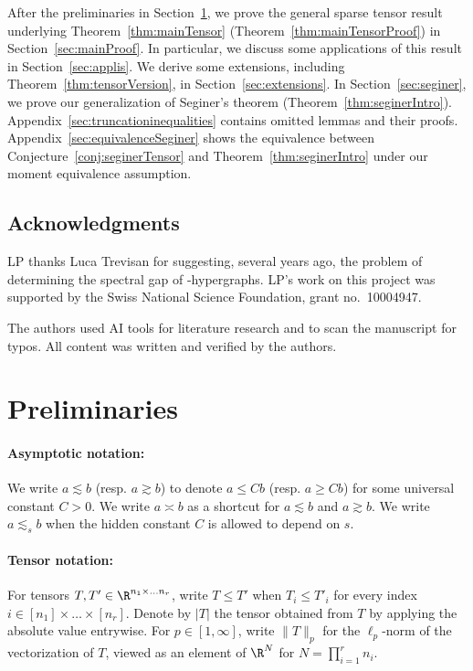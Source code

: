\documentclass[11pt,a4paper]{article}
\begin{document}
After the preliminaries in Section~\ref{sec:prelims}, we prove
the general sparse tensor result underlying Theorem~\ref{thm:mainTensor} (Theorem~\ref{thm:mainTensorProof}) in
Section~\ref{sec:mainProof}. In particular,
we discuss some applications of
this result in Section~\ref{sec:applis}.
We derive some extensions, including Theorem~\ref{thm:tensorVersion},
in Section~\ref{sec:extensions}.
In Section~\ref{sec:seginer}, we
prove our generalization of Seginer's theorem (Theorem~\ref{thm:seginerIntro}).
Appendix~\ref{sec:truncationinequalities} contains omitted lemmas and their proofs.
Appendix~\ref{sec:equivalenceSeginer}
shows the equivalence between Conjecture~\ref{conj:seginerTensor}
and Theorem~\ref{thm:seginerIntro} under
our moment equivalence assumption.

\subsection{Acknowledgments}

LP thanks Luca Trevisan for suggesting, several years ago, the problem of determining the spectral gap of \Erdos-\Renyi hypergraphs. LP's work on this
project was supported by the Swiss National Science Foundation, grant no.\ 10004947.

The authors used AI tools for literature research and to scan the manuscript for typos. All content was written and verified by the authors.

\section{Preliminaries}
\label{sec:prelims}

\paragraph{Asymptotic notation:} We write $a\lesssim b$ (resp. $a\gtrsim b$) to denote
$a\le Cb$ (resp. $a\ge Cb$) for some universal constant $C>0$. We write
$a\asymp b$ as a shortcut for
$a\lesssim b$ and $a\gtrsim b$. We
write $a\lesssim_{s} b$ when the
hidden constant $C$ is allowed to
depend on $s$.

\paragraph{Tensor notation:} For tensors $T,T'\in \R^{n_1\times \ldots n_r}$, write $T\le T'$ when $T_i\le T'_i$ for every index $i\in [n_1]\times\ldots\times[n_r]$. Denote by $|T|$ the tensor obtained
from $T$ by applying the absolute
value entrywise. For $p\in [1, \infty]$, 
write $\|T\|_p$ for the
$\ell_p$-norm of the vectorization of $T$, viewed as an element of
 $\R^N$ for $N=\prod_{i=1}^r n_i$.
\end{document}
